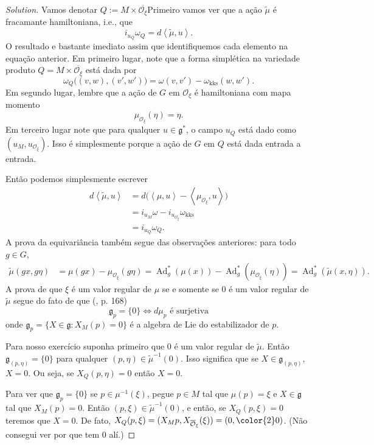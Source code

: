 \begin{proof}[Solution]\leavevmode
Vamos denotar $Q:=M \times \overline{ \mathcal{O}_\xi}$Primeiro vamos ver que a ação $\tilde{\mu}$ é fracamante hamiltoniana, i.e., que
\[i_{u_Q}\omega_{Q}=d\left<\tilde{\mu},u\right>.\]
O resultado e bastante imediato assim que identifiquemos cada elemento na equação anterior. Em primeiro lugar, note que a forma simplética na variedade produto $Q=M\times \overline{\mathcal{O}_{\xi}}$ está dada por
\[\omega_Q\Big((v,w),(v',w')\Big)=\omega(v,v')-\omega_{\operatorname{kks}}(w,w').\]
Em segundo lugar, lembre que a ação de $G$ em $\mathcal{O}_\xi$ é hamiltoniana com mapa momento
\[\mu_{\mathcal{O}_\xi}(\eta)=\eta.\]
Em terceiro lugar note que para qualquer $u\in \mathfrak{g}^* $, o campo $u_Q$ está dado como $(u_M,u_{\mathcal{O}_\xi})$. Isso é simplesmente porque a ação de $G$ em  $Q$ está dada entrada a entrada.

Então podemos simplesmente escrever
\begin{align*}d\left<\tilde{\mu},u\right>&=d\Big(\left<\mu,u\right>-\left<\mu_{\mathcal{O}_\xi},u\right>\Big)\\
&=i_{u_M}\omega-i_{u_{\mathcal{O}_\xi}}\omega_{\operatorname{kks}}\\
&=i_{u_Q}\omega_Q.
\end{align*}
A prova da equivariância também segue das observações anteriores: para todo $g \in G$,
\begin{align*}
\tilde{\mu}(gx,g\eta)&=\mu(gx)-\mu_{\mathcal{O}_\xi}(g\eta)=\operatorname{Ad}_g^*(\mu(x))-\operatorname{Ad}_{g}^*\left(\mu_{\mathcal{O}_\xi}(\eta)\right)=\operatorname{Ad}_g^*\left(\tilde{\mu}(x,\eta)\right).
\end{align*}
	A prova de que $\xi$ é um valor regular de $\mu$ se e somente se $0 $ é um valor regular de $\tilde{\mu}$ segue do fato de que (\cite{das}, p. 168)
\[\mathfrak{g}_p = \{0\} \iff d\mu_p \text{ é surjetiva} \]
onde $\mathfrak{g}_p=\{X \in \mathfrak{g}: X_M(p)=0\}$ é a algebra de Lie do estabilizador de $p$.

Para nosso exercício suponha primeiro que $0$ é um valor regular de $\tilde{\mu}$. Então $\mathfrak{g}_{(p,\eta)}=\{0\}$ para qualquer $(p,\eta)\in \tilde{\mu}^{-1}(0)$. Isso significa que se $X \in \mathfrak{g}_{(p,\eta)}$, $X=0$. Ou seja, se  $X_Q(p,\eta)=0$ então $X=0$.

Para ver que $\mathfrak{g}_p=\{0\}$ se $p \in \mu^{-1}(\xi)$, pegue $p \in M$ tal que $\mu(p)=\xi$ e $X \in \mathfrak{g}$ tal que $X_M(p)=0$. Então $(p,\xi) \in \tilde{\mu}^{-1}(0)$, e então, se $X_Q(p,\xi)=0$ teremos que $X=0$. De fato,  $X_Q(p,\xi)=(X_Mp,X_{\overline{\mathcal{O}}_\xi}(\xi))=(0, {\color{2}0})$. ({\color{3}Não consegui ver por que tem $0$ alí}.)


\end{proof}
